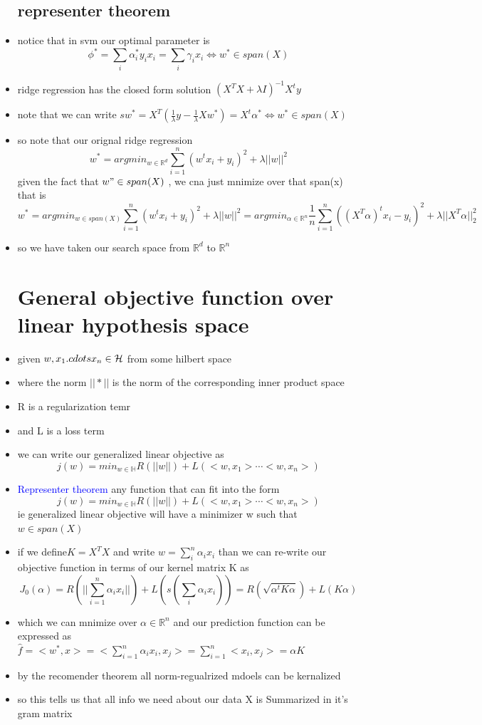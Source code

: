 \documentclass{article}
\begin{document}
\begin{itemize}
\subsection*{representer theorem}
\item notice that in svm our optimal parameter is $$\phi^{*}=\sum_{i}\alpha_i^{*}y_ix_i=\sum_i\gamma_ix_i\iff w^{*}\in span(X)$$
\item ridge regression has the closed form solution $(X^TX+\lambda I)^{-1}X^{t}y$ 
\item   note that we can write $sw^{*}=X^{T}(\frac{1}{\lambda } y -\frac{1}{\lambda } Xw^{*})=X^{t}\alpha^{*}\iff w^{*}\in span(X)$
\item so note that our orignal ridge regression $$w^{*}=argmin_{w\in \mathbb{R}^{d}}\sum_{i=1}^{n}(w^tx_i+y_i)^{2}+\lambda||w||^{2}$$ given the fact that $w"\in span(X)$ , we cna just mnimize over that span(x)
that is $$w^{*}=argmin_{w\in span(X)}\sum_{i=1}^{n}(w^tx_i+y_i)^{2}+\lambda||w||^{2}=argmin_{\alpha\in \mathbb{R}^{n}}\frac{1}{n}\sum_{i=1}^{n}((X^T\alpha)^tx_i -y_i)^{2}+\lambda ||X^T\alpha||_2^{2}$$ 
\item so we have taken our search space from $\mathbb{R}^{d}$ to $\mathbb{R}^{n}$
\section*{General objective function over linear hypothesis space}
\item given $w,x_1.\\cdots x_n \in \mathcal{H}$ from some hilbert space 
\item where the norm $||*||$ is the norm of the corresponding inner product space
\item R is a regularization temr 
\item and L is a loss term 
\item we can write our generalized linear objective as $$j(w)=min_{w\in \mathbb{H}}R(||w||)+L(<w,x_1> \cdots <w,x_n>)$$ 
\item \textcolor{blue}{Representer theorem} any function that can fit into the form $$j(w)=min_{w\in \mathbb{H}}R(||w||)+L(<w,x_1> \cdots <w,x_n>)$$  ie generalized linear objective will have a minimizer w such that $w\in span(X)$
\item if we define$ K=X^TX$ and write $w=\sum_{i}^{n}\alpha_i x_i $ than we can re-write our objective function in terms of our kernel matrix K as $$J_{0}(\alpha)=R(||\sum_{i=1}^{n}\alpha_{i}x_i||) + L(s(\sum_{i}\alpha_ix_i))=R(\sqrt{\alpha^{t}K\alpha})+L(K\alpha)$$
\item  which we can mnimize over $\alpha\in \mathbb{R}^{n}$ and our prediction function can be expressed as $\hat{f}=<w^{*}, x> =<\sum_{i=1}^{n}\alpha_ix_i, x_j> =\sum_{i=1}^{n}<x_i,x_j>=\alpha K$
\item by the recomender theorem all norm-regualrized mdoels can be kernalized 
\item so this tells us that all info we need about our data X is Summarized in it's gram matrix  
\end{itemize}
\end{document}
